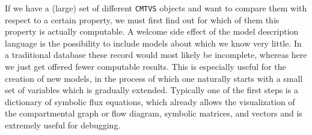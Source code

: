 If we have a (large) set of different \texttt{CMTVS} objects and want to
compare them with respect to a certain property, we must first find out for
which of them this property is actually computable.  A welcome side effect
of the  model description language is the possibility to include
models about which we know very little. In a traditional database these
record would most likely be incomplete, whereas here we just get offered
fewer computable results.  
This is especially useful for the creation of new
models, in the process of which one naturally starts with a small set of
variables which is gradually extended.
Typically one of the first steps is a dictionary of symbolic flux equations, which already allows the visualization
of the compartmental graph or flow diagram, symbolic matrices, and vectors and is extremely useful for debugging.



